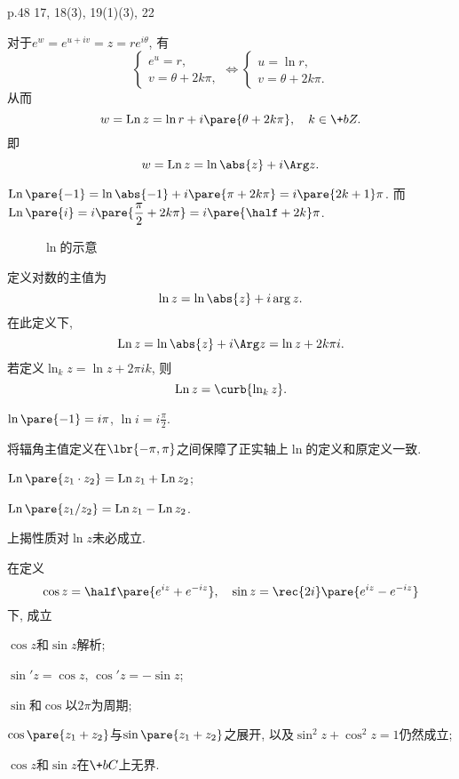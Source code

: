 \documentclass{ctexart}
\DeclareMathOperator{\Ln}{Ln}
\begin{document}
p.48 17, 18(3), 19(1)(3), 22


对于$e^w = e^{u+iv} = z = re^{i\theta}$, 有
\[ \begin{cases}
    e^u = r,\\
    v = \theta + 2k\pi,
\end{cases}\Leftrightarrow \begin{cases}
    u = \ln r,\\
    v = \theta + 2k\pi.
\end{cases} \]
从而
\[ w = \Ln z = \ln r + i\pare{\theta+2k\pi},\quad k\in\+bZ. \]
即
\[ w = \Ln z = \ln\abs{z} + i\Arg z. \]
\begin{sample}
    \begin{ex}
        $\Ln \pare{-1} = \ln \abs{-1} + i\pare{\pi + 2k\pi} = i\pare{2k+1}\pi$. 而$\Ln \pare{i} = i\pare{\displaystyle \frac{\pi}{2} + 2k\pi} = i\pare{\displaystyle \half + 2k}\pi$.
    \end{ex}
\end{sample}
\begin{figure}[ht]
    \centering
    \caption{$\ln$的示意}
    \label{fig:ln的示意}
\end{figure}
定义对数的主值为
\[ \ln z = \ln \abs{z} + i\arg z. \]
在此定义下,
\[ \Ln z = \ln\abs{z} + i\Arg z = \ln z + 2k\pi i. \]
若定义$\ln_k z = \ln z + 2\pi i k$, 则
\[ \Ln z  = \curb{\ln_k z}. \]
\begin{sample}
    \begin{ex}
        $\ln\pare{-1} = i\pi$, $\ln i = i\displaystyle\frac{\pi}{2}$.
    \end{ex}
\end{sample}
\begin{remark}
    将辐角主值定义在$\lbr{-\pi,\pi}$之间保障了正实轴上$\ln$的定义和原定义一致.
\end{remark}
\begin{proposition}[$\Ln$的古典性质]
    \mbox{}
    \begin{cenum}
        \item $\Ln \pare{z_1\cdot z_2} = \Ln z_1 + \Ln z_2$;
        \item $\Ln \pare{z_1/z_2} = \Ln z_1 - \Ln z_2$.
    \end{cenum}
\end{proposition}
\begin{pitfall}
    上揭性质对$\ln z$未必成立.
\end{pitfall}
在定义
\[ \cos z = \half \pare{e^{iz} + e^{-iz}}, \quad \sin z = \rec{2i}\pare{e^{iz} - e^{-iz}} \]
下, 成立
\begin{cenum}
    \item $\cos z$和$\sin z$解析;
    \item $\sin' z = \cos z$, $\cos' z = -\sin z$;
    \item $\sin$和$\cos$以$2\pi$为周期;
    \item $\cos \pare{z_1+z_2}$与$\sin \pare{z_1+z_2}$之展开, 以及$\sin^2 z + \cos^2 z = 1$仍然成立;
    \item $\cos z$和$\sin z$在$\+bC$上无界.
\end{cenum}
\end{document}
